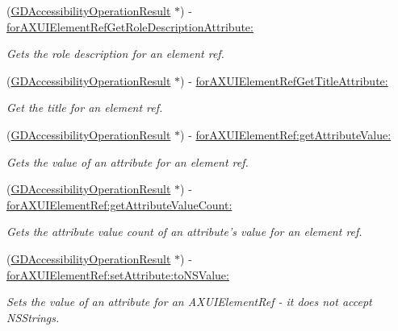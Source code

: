 \begin{DoxyCompactItemize}
(\hyperlink{interface_g_d_accessibility_operation_result}{GDAccessibilityOperationResult} $\ast$) -\/ \hyperlink{interface_g_d_accessibility_manager_a9baf3dca0931b22a95686fe9334bde04}{forAXUIElementRefGetRoleDescriptionAttribute:}
\begin{DoxyCompactList}\small\item\em Gets the role description for an element ref. \item\end{DoxyCompactList}\item 
(\hyperlink{interface_g_d_accessibility_operation_result}{GDAccessibilityOperationResult} $\ast$) -\/ \hyperlink{interface_g_d_accessibility_manager_aef0a1b068f6f5a31cf44aaad7bce6654}{forAXUIElementRefGetTitleAttribute:}
\begin{DoxyCompactList}\small\item\em Get the title for an element ref. \item\end{DoxyCompactList}\item 
(\hyperlink{interface_g_d_accessibility_operation_result}{GDAccessibilityOperationResult} $\ast$) -\/ \hyperlink{interface_g_d_accessibility_manager_a07aa52aa7ad4f2a130e8448bc8bedf47}{forAXUIElementRef:getAttributeValue:}
\begin{DoxyCompactList}\small\item\em Gets the value of an attribute for an element ref. \item\end{DoxyCompactList}\item 
(\hyperlink{interface_g_d_accessibility_operation_result}{GDAccessibilityOperationResult} $\ast$) -\/ \hyperlink{interface_g_d_accessibility_manager_a043c9bc6dd9c456ccf038eef0c765dcd}{forAXUIElementRef:getAttributeValueCount:}
\begin{DoxyCompactList}\small\item\em Gets the attribute value count of an attribute's value for an element ref. \item\end{DoxyCompactList}\item 
(\hyperlink{interface_g_d_accessibility_operation_result}{GDAccessibilityOperationResult} $\ast$) -\/ \hyperlink{interface_g_d_accessibility_manager_a9a03f4ae6cc68077a661f139293ba9cc}{forAXUIElementRef:setAttribute:toNSValue:}
\begin{DoxyCompactList}\small\item\em Sets the value of an attribute for an AXUIElementRef -\/ it does not accept NSStrings. \item\end{DoxyCompactList}\item 

\end{DoxyCompactItemize}
